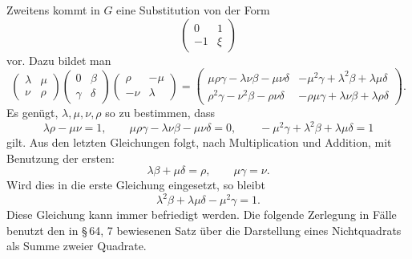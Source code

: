 \documentclass[11pt]{article}
\begin{document}
Zweitens kommt in $G$ eine Substitution von der Form
\[
 \begin{pmatrix}0&1\\-1&\xi\end{pmatrix}
\]
vor. Dazu bildet man
\begin{equation}
 \begin{pmatrix}\lambda&\mu\\ \nu&\rho\end{pmatrix}
 \begin{pmatrix}0&\beta\\ \gamma&\delta\end{pmatrix}
 \begin{pmatrix}\rho&-\mu\\-\nu&\lambda\end{pmatrix}
 =
 \begin{pmatrix}
 \mu\rho\gamma-\lambda\nu\beta-\mu\nu\delta&
 -\mu^2\gamma+\lambda^2\beta+\lambda\mu\delta\\
 \rho^2\gamma-\nu^2\beta-\rho\nu\delta&
 -\rho\mu\gamma+\lambda\nu\beta+\lambda\rho\delta
 \end{pmatrix}. \tag{5}
\end{equation}
Es genügt, $\lambda,\mu,\nu,\rho$ so zu bestimmen, dass
\begin{equation}
 \lambda\rho-\mu\nu=1,\qquad
 \mu\rho\gamma-\lambda\nu\beta-\mu\nu\delta=0,\qquad
 -\mu^2\gamma+\lambda^2\beta+\lambda\mu\delta=1 \tag{6}
\end{equation}
gilt. Aus den letzten Gleichungen folgt, nach Multiplication und Addition, mit Benutzung der ersten:
\begin{equation}
 \lambda\beta+\mu\delta=\rho,\qquad \mu\gamma=\nu. \tag{7}
\end{equation}
Wird dies in die erste Gleichung eingesetzt, so bleibt
\begin{equation}
 \lambda^2\beta+\lambda\mu\delta-\mu^2\gamma=1. \tag{8}
\end{equation}
Diese Gleichung kann immer befriedigt werden. Die folgende Zerlegung in Fälle benutzt den in \S\,64, 7 bewiesenen Satz über die Darstellung eines Nichtquadrats als Summe zweier Quadrate.
\end{document}

